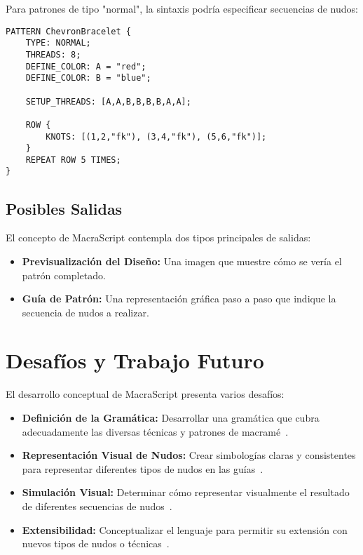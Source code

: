 \documentclass[conference]{IEEEtran}
\begin{document}
Para patrones de tipo "normal", la sintaxis podría especificar secuencias de nudos:

\begin{verbatim}
PATTERN ChevronBracelet {
    TYPE: NORMAL;
    THREADS: 8;
    DEFINE_COLOR: A = "red";
    DEFINE_COLOR: B = "blue";

    SETUP_THREADS: [A,A,B,B,B,B,A,A];

    ROW {
        KNOTS: [(1,2,"fk"), (3,4,"fk"), (5,6,"fk")];
    }
    REPEAT ROW 5 TIMES;
}
\end{verbatim}

\subsection{Posibles Salidas}
El concepto de MacraScript contempla dos tipos principales de salidas:

\begin{itemize}
    \item \textbf{Previsualización del Diseño:} Una imagen que muestre cómo se vería el patrón completado.
    \item \textbf{Guía de Patrón:} Una representación gráfica paso a paso que indique la secuencia de nudos a realizar.
\end{itemize}

\section{Desafíos y Trabajo Futuro}
El desarrollo conceptual de MacraScript presenta varios desafíos:

\begin{itemize}
    \item \textbf{Definición de la Gramática:} Desarrollar una gramática que cubra adecuadamente las diversas técnicas y patrones de macramé~\cite{mernik2005}.
    \item \textbf{Representación Visual de Nudos:} Crear simbologías claras y consistentes para representar diferentes tipos de nudos en las guías~\cite{hashemi2017}.
    \item \textbf{Simulación Visual:} Determinar cómo representar visualmente el resultado de diferentes secuencias de nudos~\cite{hudson2018}.
    \item \textbf{Extensibilidad:} Conceptualizar el lenguaje para permitir su extensión con nuevos tipos de nudos o técnicas~\cite{voelter2013}.
\end{itemize}
\end{document}
